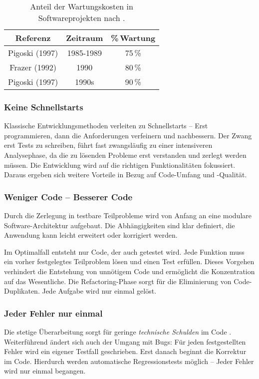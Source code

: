 \begin{table}
	\centering
\begin{tabular}{ccc}
	\toprule Referenz & Zeitraum & \%\,Wartung \\ 
	\midrule Pigoski (1997) & 1985-1989 & 75\,\% \\ 
			 Frazer (1992) & 1990 & 80\,\% \\ 
			 Pigoski (1997) & 1990s & 90\,\% \\ 
	\bottomrule 
\end{tabular} 
\caption{Anteil der Wartungskosten in Softwareprojekten nach \cite[S.\,229]{PoloPiattiniRuiz2002}.}
\label{tab:maintenance-cost}
\end{table} 

\subsubsection{Keine Schnellstarts}
Klassische Entwicklungsmethoden verleiten zu Schnellstarts -- Erst programmieren, dann die Anforderungen verfeinern und nachbessern. Der Zwang erst Tests zu schreiben, führt fast zwangsläufig zu einer intensiveren Analysephase, da die zu lösenden Probleme erst verstanden und zerlegt werden müssen. Die Entwicklung wird auf die richtigen Funktionalitäten fokussiert. Daraus ergeben sich weitere Vorteile in Bezug auf Code-Umfang und -Qualität.

\subsubsection{Weniger Code -- Besserer Code}
Durch die Zerlegung in testbare Teilprobleme wird von Anfang an eine modulare Software-Architektur aufgebaut. Die Abhängigkeiten sind klar definiert, die Anwendung kann leicht erweitert oder korrigiert werden.

Im Optimalfall entsteht nur Code, der auch getestet wird. Jede Funktion muss ein vorher festgelegtes Teilproblem lösen und einen Test erfüllen. Dieses Vorgehen verhindert die Entstehung von unnötigem Code und ermöglicht die Konzentration auf das Wesentliche. Die Refactoring-Phase sorgt für die Eliminierung von Code-Duplikaten. Jede Aufgabe wird nur einmal gelöst.

\subsubsection{Jeder Fehler nur einmal}
Die stetige Überarbeitung sorgt für geringe \textit{technische Schulden} im Code \cite[S.\ 13]{Springer2015}. Weiterführend ändert sich auch der Umgang mit Bugs: Für jeden festgestellten Fehler wird ein eigener Testfall geschrieben. Erst danach beginnt die Korrektur im Code. Hierdurch werden automatische Regressionstests möglich -- Jeder Fehler wird nur einmal begangen.

